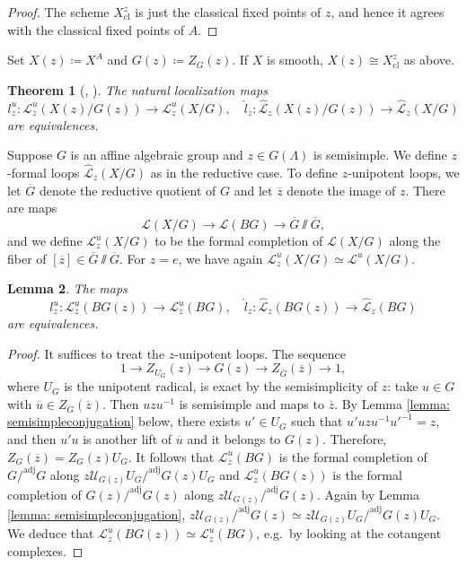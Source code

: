 \documentclass{amsart}
\newtheorem{theorem}{Theorem}[subsection]
\newtheorem{lemma}[theorem]{Lemma}
\theoremstyle{definition}
\theoremstyle{remark}
\numberwithin{equation}{section}
\newcommand{\mc}{\mathcal}
\newcommand{\wh}{\widehat}
\newcommand{\cl}{\mathrm{cl}}
\newcommand{\adj}{\mathrm{adj}}
\begin{document}
\begin{proof}
The scheme $X^z_{\cl}$ is just the classical fixed points of $z$, and hence it agrees with the classical fixed points of $A$. 
\end{proof}

Set $X(z)\coloneq X^A$ and $G(z)\coloneq Z_G (z)$. If $X$ is smooth, $X(z)\cong X^z_{\cl}$ as above.

\begin{theorem}[{\cite[Theorem 3.1.12]{Chenequivariant}, \cite[Theorem 2.9]{BCHNconstructible}}]\label{thm: LoopSpaceLocalization}
The natural localization maps
\[
l^u_z \colon \mc L^u_z (X(z)/G(z)) \to \mc L^u_z (X/G), \quad \wh{l}_z\colon \wh{\mc L}_z (X(z)/G(z))\to \wh{\mc L}_z(X/G)
\]
are equivalences. 
\end{theorem}

Suppose $G$ is an affine algebraic group and $z\in G(\Lambda)$ is semisimple. We define $z$-formal loops $\wh{\mc L}_z(X/G)$ as in the reductive case. To define $z$-unipotent loops, we let $\overline{G}$ denote the reductive quotient of $G$ and let $\overline{z}$ denote the image of $z$. There are maps
\[
\mc L(X/G) \to \mc L(BG) \to \overline{G}\sslash \overline{G}, 
\]
and we define $\mc L^u_z (X/G)$ to be the formal completion of $\mc L(X/G)$ along the fiber of $[\overline{z}]\in \overline{G}\sslash \overline{G}$. For $z=e$, we have again $\mc{L}^u_z (X/G)\simeq \mc L^u (X/G)$. 

\begin{lemma}\label{lemma: NonreductiveLocalization}
The maps 
\[
l^u_z\colon \mc L^u_z (BG(z))\to \mc L^u_z (BG), \quad \wh{l}_z\colon \wh{\mc L}_z (BG(z))\to \wh{\mc L}_z (BG)
\]
are equivalences. 
\end{lemma}

\begin{proof}
It suffices to treat the $z$-unipotent loops. The sequence
\[
1 \to Z_{U_G}(z) \to G(z) \to Z_{\overline{G}}(\overline{z})\to 1,
\]
where $U_G$ is the unipotent radical, is exact by the semisimplicity of $z$: take $u \in G$ with $\overline{u}\in Z_{\overline{G}}(\overline{z})$. Then $uzu^{-1}$ is semisimple and maps to $\overline{z}$. By Lemma \ref{lemma: semisimpleconjugation} below, there exists $u'\in U_G$ such that $u' uzu^{-1}u'^{-1}=z$, and then $u'u$ is another lift of $\overline{u}$ and it belongs to $G(z)$. Therefore, $Z_G (\overline{z})=Z_G(z)U_G$. It follows that $\mc L^u_z (BG)$ is the formal completion of $G/^\adj G$ along $z\mc U_{G(z)}U_G /^\adj G(z)U_G$ and $\mc L^u_z (BG(z))$ is the formal completion of $G(z)/^\adj G(z)$ along $ z \mc U_{G(z)}/^\adj G(z)$. Again by Lemma \ref{lemma: semisimpleconjugation}, $ z \mc U_{G(z)}/^\adj G(z)\simeq z\mc U_{G(z)}U_G /^\adj G(z)U_G$. We deduce that $\mc L^u_z (BG(z))\simeq \mc L^u_z (BG)$, e.g.~by looking at the cotangent complexes.  
\end{proof}
\end{document}
